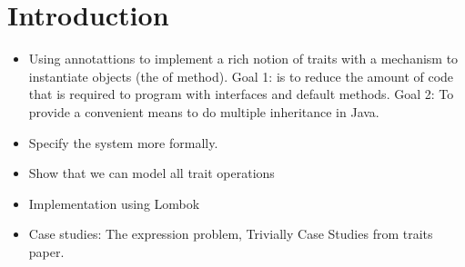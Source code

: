 \section{Introduction}\label{sec:intro}

\begin{itemize}

\item Using annotattions to implement a rich notion of traits with a
mechanism to instantiate objects (the of method). Goal 1: is to reduce
the amount of code that is required to program with interfaces and default
methods. Goal 2: To provide a convenient means to do multiple inheritance
in Java.

\item Specify the system more formally.

\item Show that we can model all trait operations

\item Implementation using Lombok

\item Case studies: The expression problem, Trivially
Case Studies from traits paper.

\end{itemize}